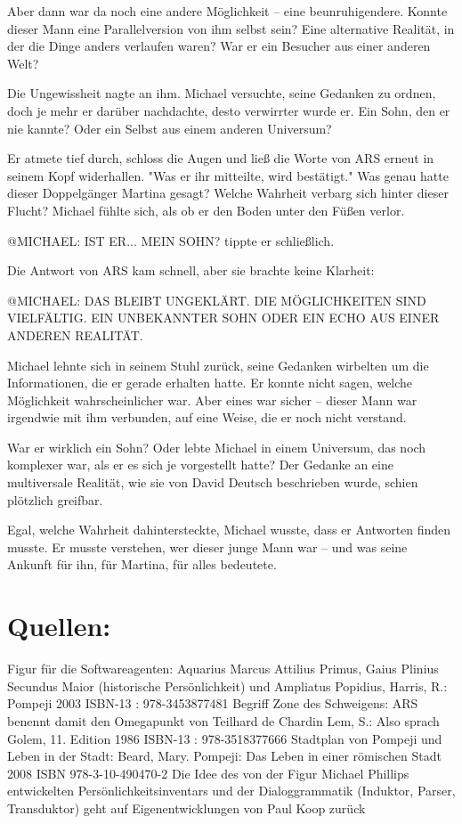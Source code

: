 \documentclass[
]{article}
\begin{document}
Aber dann war da noch eine andere Möglichkeit -- eine beunruhigendere.
Konnte dieser Mann eine Parallelversion von ihm selbst sein? Eine
alternative Realität, in der die Dinge anders verlaufen waren? War er
ein Besucher aus einer anderen Welt?

Die Ungewissheit nagte an ihm. Michael versuchte, seine Gedanken zu
ordnen, doch je mehr er darüber nachdachte, desto verwirrter wurde er.
Ein Sohn, den er nie kannte? Oder ein Selbst aus einem anderen
Universum?

Er atmete tief durch, schloss die Augen und ließ die Worte von ARS
erneut in seinem Kopf widerhallen. "Was er ihr mitteilte, wird
bestätigt." Was genau hatte dieser Doppelgänger Martina gesagt? Welche
Wahrheit verbarg sich hinter dieser Flucht? Michael fühlte sich, als ob
er den Boden unter den Füßen verlor.

@MICHAEL: IST ER... MEIN SOHN? tippte er schließlich.

Die Antwort von ARS kam schnell, aber sie brachte keine Klarheit:

@MICHAEL: DAS BLEIBT UNGEKLÄRT. DIE MÖGLICHKEITEN SIND VIELFÄLTIG. EIN
UNBEKANNTER SOHN ODER EIN ECHO AUS EINER ANDEREN REALITÄT.

Michael lehnte sich in seinem Stuhl zurück, seine Gedanken wirbelten um
die Informationen, die er gerade erhalten hatte. Er konnte nicht sagen,
welche Möglichkeit wahrscheinlicher war. Aber eines war sicher -- dieser
Mann war irgendwie mit ihm verbunden, auf eine Weise, die er noch nicht
verstand.

War er wirklich ein Sohn? Oder lebte Michael in einem Universum, das
noch komplexer war, als er es sich je vorgestellt hatte? Der Gedanke an
eine multiversale Realität, wie sie von David Deutsch beschrieben wurde,
schien plötzlich greifbar.

Egal, welche Wahrheit dahintersteckte, Michael wusste, dass er Antworten
finden musste. Er musste verstehen, wer dieser junge Mann war -- und was
seine Ankunft für ihn, für Martina, für alles bedeutete.

\section{\texorpdfstring{Quellen: }{Quellen: }}\label{quellen}

Figur für die Softwareagenten: Aquarius Marcus Attilius Primus, Gaius
Plinius Secundus Maior (historische Persönlichkeit) und Ampliatus
Popidius, Harris, R.: Pompeji 2003 ISBN-13 : 978-3453877481 Begriff Zone
des Schweigens: ARS benennt damit den Omegapunkt von Teilhard de Chardin
Lem, S.: Also sprach Golem, 11. Edition 1986 ISBN-13 : 978-3518377666
Stadtplan von Pompeji und Leben in der Stadt: Beard, Mary. Pompeji: Das
Leben in einer römischen Stadt 2008 ISBN 978-3-10-490470-2 Die Idee des
von der Figur Michael Phillips entwickelten Persönlichkeitsinventars und
der Dialoggrammatik (Induktor, Parser, Transduktor) geht auf
Eigenentwicklungen von Paul Koop zurück
\end{document}
